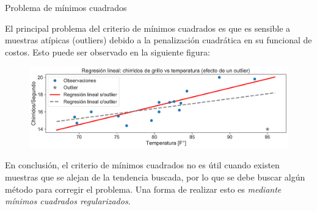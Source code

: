 \documentclass[handout, 9pt]{beamer}
\begin{document}
\begin{frame}{Problema de mínimos cuadrados}

El principal problema del criterio de mínimos cuadrados es que es sensible a muestras atípicas (outliers) debido a la penalización cuadrática en su funcional de costos. Esto puede ser observado en la siguiente figura:

\begin{figure}[h]
	\centering
	\includegraphics[width=1\textwidth]{../../img/cap2_chirridos_outlier.pdf}\\
\end{figure} \pause

En conclusión, el criterio de mínimos cuadrados no es útil cuando existen muestras que se alejan de la tendencia buscada, por lo que se debe buscar algún método para corregir el problema. Una forma de realizar esto es \emph{mediante mínimos cuadrados regularizados}.
	
\end{frame}
\end{document}
